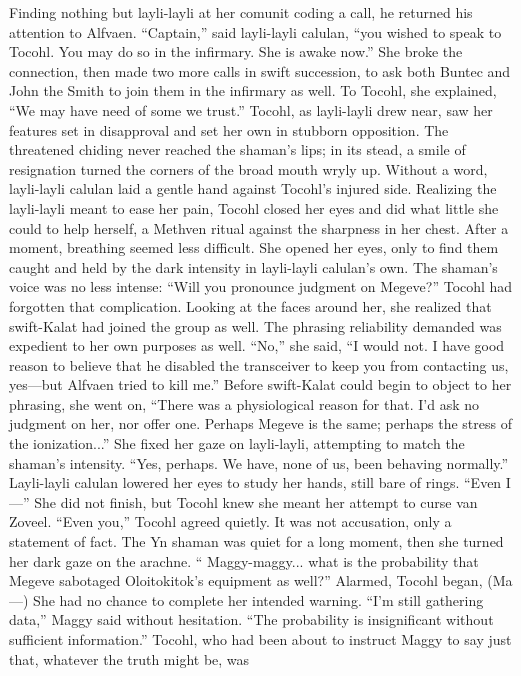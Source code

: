 \documentclass[9pt]{article}
\begin{document}
Finding nothing but layli-layli at her comunit coding a call, he returned his attention to Alfvaen.
“Captain,” said layli-layli calulan, “you wished to speak to Tocohl. You may do so in the infirmary.
She is awake now.” She broke the connection, then made two more calls in swift succession, to ask both
Buntec and John the Smith to join them in the infirmary as well. To Tocohl, she explained, “We may have
need of some we trust.”
Tocohl, as layli-layli drew near, saw her features set in disapproval and set her own in stubborn
opposition. The threatened chiding never reached the shaman’s lips; in its stead, a smile of resignation
turned the corners of the broad mouth wryly up. Without a word, layli-layli calulan laid a gentle hand
against Tocohl’s injured side. Realizing the layli-layli meant to ease her pain, Tocohl closed her eyes and
did what little she could to help herself, a Methven ritual against the sharpness in her chest. After a
moment, breathing seemed less difficult.
She opened her eyes, only to find them caught and held by the dark intensity in layli-layli calulan’s
own.
The shaman’s voice was no less intense: “Will you pronounce judgment on Megeve?”
Tocohl had forgotten that complication. Looking at the faces around her, she realized that swift-Kalat
had joined the group as well. The phrasing reliability demanded was expedient to her own purposes as
well. “No,” she said, “I would not. I have good reason to believe that he disabled the transceiver to keep
you from contacting us, yes—but Alfvaen tried to kill me.”
Before swift-Kalat could begin to object to her phrasing, she went on, “There was a physiological
reason for that. I’d ask no judgment on her, nor offer one. Perhaps Megeve is the same; perhaps the
stress of the ionization...” She fixed her gaze on layli-layli, attempting to match the shaman’s intensity.
“Yes, perhaps. We have, none of us, been behaving normally.” Layli-layli calulan lowered her eyes
to study her hands, still bare of rings. “Even I—”
She did not finish, but Tocohl knew she meant her attempt to curse van Zoveel. “Even you,” Tocohl
agreed quietly. It was not accusation, only a statement of fact.
The Yn shaman was quiet for a long moment, then she turned her dark gaze on the arachne. “
Maggy-maggy... what is the probability that Megeve sabotaged Oloitokitok’s equipment as well?”
Alarmed, Tocohl began, (Ma—) She had no chance to complete her intended warning. “I’m still
gathering data,” Maggy said without hesitation. “The probability is insignificant without sufficient
information.”
Tocohl, who had been about to instruct Maggy to say just that, whatever the truth might be, was
\end{document}
